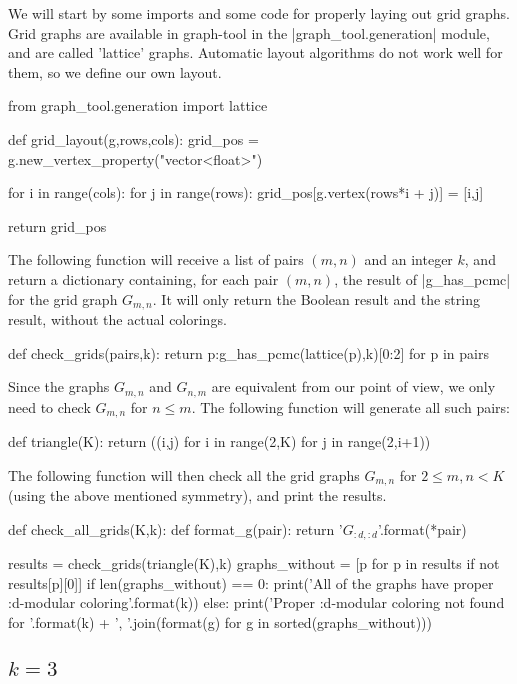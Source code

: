\documentclass[letterpaper]{article}
\begin{document}
We will start by some imports and some code for properly laying
out grid graphs. Grid graphs are available in graph-tool in the
\pyv|graph_tool.generation| module, and are called 'lattice'
graphs.  Automatic layout algorithms do not work well for them, so
we define our own layout.
\begin{pyblock}
from graph_tool.generation import lattice  

def grid_layout(g,rows,cols):
   grid_pos = g.new_vertex_property("vector<float>")

   for i in range(cols):
      for j in range(rows):
         grid_pos[g.vertex(rows*i + j)] = [i,j]

   return grid_pos
\end{pyblock}

The following function will receive a list of pairs $(m,n)$ and an integer $k$,
and return a dictionary containing, for each pair $(m,n)$, the result of
\pyv|g_has_pcmc| for the grid graph $G_{m,n}$. It will only return the Boolean
result and the string result, without the actual colorings. 
\begin{pyblock}
def check_grids(pairs,k):
   return {p:g_has_pcmc(lattice(p),k)[0:2] for p in pairs}
\end{pyblock}

Since the graphs $G_{m,n}$ and $G_{n,m}$ are equivalent from our point of view,
we only need to check $G_{m,n}$ for $n\le m$.  The following function will
generate all such pairs:
\begin{pyblock}
def triangle(K):
   return ((i,j) for i in range(2,K) for j in range(2,i+1))
\end{pyblock}

The following function will then check all the grid graphs $G_{m,n}$ for $2 \le
m,n < K$ (using the above mentioned symmetry), and print the results.
\begin{pyblock}
def check_all_grids(K,k):
   def format_g(pair):
      return '$G_{{{:d},{:d}}}$'.format(*pair)

   results = check_grids(triangle(K),k)
   graphs_without = [p for p in results if not results[p][0]]
   if len(graphs_without) == 0:
      print('All of the graphs have proper {:d}-modular coloring'.format(k))
   else:
      print('Proper {:d}-modular coloring not found for '.format(k) + 
         ', '.join(format(g) for g in sorted(graphs_without)))
\end{pyblock}

\subsection{$k = 3$}
\end{document}
